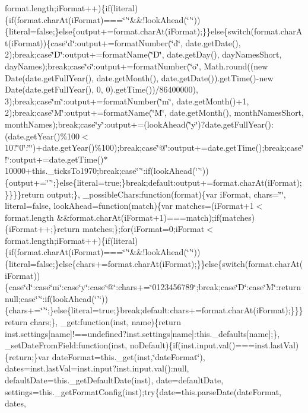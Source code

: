 {{\begin{DoxyParamCaption}
format.\+length;i\+Format++)\{if(literal)\{if(format.\+char\+At(i\+Format)===\char`\"{}'\char`\"{}\&\&!look\+Ahead(\char`\"{}'\char`\"{}))\{literal=false;\}else\{output+=format.\+char\+At(i\+Format);\}\}else\{switch(format.\+char\+At(i\+Format))\{case\char`\"{}d\char`\"{}\+:output+=format\+Number(\char`\"{}d\char`\"{}, date.\+get\+Date(), 2);break;case\char`\"{}\+D\char`\"{}\+:output+=format\+Name(\char`\"{}\+D\char`\"{}, date.\+get\+Day(), day\+Names\+Short, day\+Names);break;case\char`\"{}o\char`\"{}\+:output+=format\+Number(\char`\"{}o\char`\"{}, Math.\+round((new Date(date.\+get\+Full\+Year(), date.\+get\+Month(), date.\+get\+Date()).\+get\+Time()-\/new Date(date.\+get\+Full\+Year(), 0, 0).\+get\+Time())/86400000), 3);break;case\char`\"{}m\char`\"{}\+:output+=format\+Number(\char`\"{}m\char`\"{}, date.\+get\+Month()+1, 2);break;case\char`\"{}\+M\char`\"{}\+:output+=format\+Name(\char`\"{}\+M\char`\"{}, date.\+get\+Month(), month\+Names\+Short, month\+Names);break;case\char`\"{}y\char`\"{}\+:output+=(look\+Ahead(\char`\"{}y\char`\"{})?date.\+get\+Full\+Year()\+:(date.\+get\+Year()\%100$<$ 10?\char`\"{}0\char`\"{}\+:\char`\"{}\char`\"{})+date.\+get\+Year()\%100);break;case\char`\"{}@\char`\"{}\+:output+=date.\+get\+Time();break;case\char`\"{}!\char`\"{}\+:output+=date.\+get\+Time()$\ast$10000+this.\+\_\+ticks\+To1970;break;case\char`\"{}'\char`\"{}\+:if(look\+Ahead(\char`\"{}'\char`\"{}))\{output+=\char`\"{}'\char`\"{};\}else\{literal=true;\}break;default\+:output+=format.\+char\+At(i\+Format);\}\}\}\}return output;\}, \+\_\+possible\+Chars\+:function(format)\{var i\+Format, chars=\char`\"{}\char`\"{}, literal=false, look\+Ahead=function(match)\{var matches=(i\+Format+1$<$ format.\+length \&\&format.\+char\+At(i\+Format+1)===match);if(matches)\{i\+Format++;\}return matches;\};for(i\+Format=0;i\+Format$<$ format.\+length;i\+Format++)\{if(literal)\{if(format.\+char\+At(i\+Format)===\char`\"{}'\char`\"{}\&\&!look\+Ahead(\char`\"{}'\char`\"{}))\{literal=false;\}else\{chars+=format.\+char\+At(i\+Format);\}\}else\{switch(format.\+char\+At(i\+Format))\{case\char`\"{}d\char`\"{}\+:case\char`\"{}m\char`\"{}\+:case\char`\"{}y\char`\"{}\+:case\char`\"{}@\char`\"{}\+:chars+=\char`\"{}0123456789\char`\"{};break;case\char`\"{}\+D\char`\"{}\+:case\char`\"{}\+M\char`\"{}\+:return null;case\char`\"{}'\char`\"{}\+:if(look\+Ahead(\char`\"{}'\char`\"{}))\{chars+=\char`\"{}'\char`\"{};\}else\{literal=true;\}break;default\+:chars+=format.\+char\+At(i\+Format);\}\}\}return chars;\}, \+\_\+get\+:function(inst, name)\{return inst.\+settings\mbox{[}name\mbox{]}!==undefined?inst.\+settings\mbox{[}name\mbox{]}\+:this.\+\_\+defaults\mbox{[}name\mbox{]};\}, \+\_\+set\+Date\+From\+Field\+:function(inst, no\+Default)\{if(inst.\+input.\+val()===inst.\+last\+Val)\{return;\}var date\+Format=this.\+\_\+get(inst,\char`\"{}date\+Format\char`\"{}), dates=inst.\+last\+Val=inst.\+input?inst.\+input.\+val()\+:null, default\+Date=this.\+\_\+get\+Default\+Date(inst), date=default\+Date, settings=this.\+\_\+get\+Format\+Config(inst);try\{date=this.\+parse\+Date(date\+Format, dates, 
\end{DoxyParamCaption}}}

